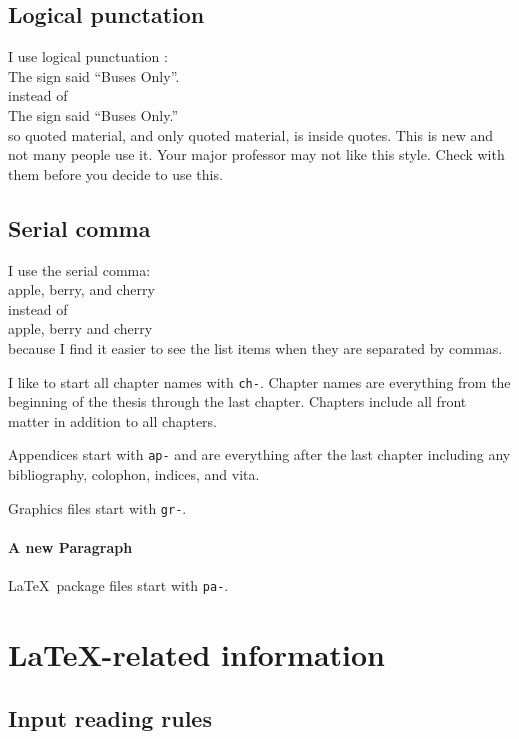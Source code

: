 \subsection{Logical punctation}

I use logical punctuation \cite{yagoda2011}:\\
   The sign said ``Buses Only''.\\
instead of\\
   The sign said ``Buses Only.''\\
so quoted material,
and only quoted material,
is inside quotes.
This is new and not many people use it.
Your major professor may not like this style.
Check with them before you decide to use this.


\subsection{Serial comma}

I use the serial comma:\\
   apple, berry, and cherry\\
instead of\\
   apple, berry and cherry\\
because I find it easier
to see the list items
when they are separated by commas.





I like
to start all chapter names with \verb+ch-+.
Chapter names are everything
from the beginning of the thesis through the last chapter.
Chapters include all front matter
in addition to all chapters.

Appendices start with \verb+ap-+ and are everything after the last chapter
including any bibliography,
colophon,
indices,
and vita.

Graphics files start with \verb+gr-+.

\paragraph{A new Paragraph}

\LaTeX\ package files start with \verb+pa-+.


\section{\LaTeX-related information}

\subsection{Input reading rules}

